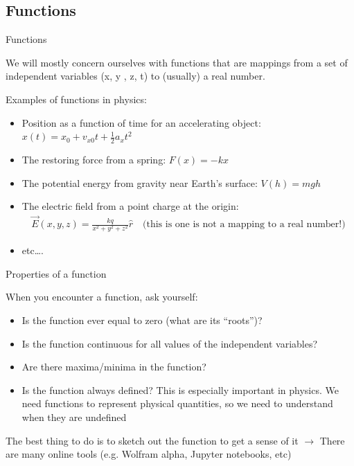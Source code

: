 \documentclass[aspectratio=169,
hyperref={colorlinks,urlcolor=blue}
]{beamer}
\begin{document}
\subsection{Functions}
\label{subsec:functions}
\begin{bulletframe}{Functions}
 \item We will mostly concern ourselves with functions that are mappings from a set of independent variables (x, y , z, t) to (usually) a real number.
 \item Examples of functions in physics:
 \begin{itemize}
  \item Position as a function of time for an accelerating object: $x(t)=x_0+v_{x0}t+\frac{1}{2}a_xt^2$
 \item The restoring force from a spring: $F(x) = -kx$
 \item The potential energy from gravity near Earth’s surface: $V(h) = mgh$ 
 \item The electric field from a point charge at the origin: 
 \begin{align*}
 \vec E(x,y,z) =\frac{kq}{x ^2+y^2+z^2}\hat r \quad \text{(this is one is not a mapping to a real number!)}
 \end{align*} 
\item etc….
 \end{itemize}
\end{bulletframe}


\begin{bulletframe}{Properties of a function}
 \item When you encounter a function, ask yourself:
 \begin{itemize}
  \item Is the function ever equal to zero (what are its “roots”)?
 \item Is the function continuous for all values of the independent variables?
 \item Are there maxima/minima in the function?
 \item Is the function always defined? This is especially important in physics. We need functions to represent physical quantities, so we need to understand when they are undefined
 \end{itemize}
 \item The best thing to do is to sketch out the function to get a sense of it $\rightarrow$ There are many online tools (e.g. Wolfram alpha, Jupyter notebooks, etc)
\end{bulletframe}
\end{document}

